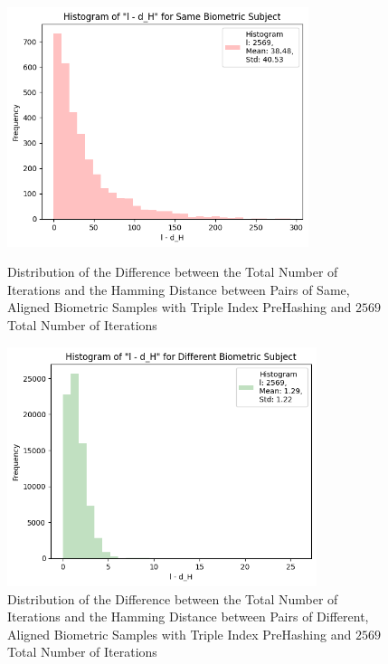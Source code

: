 \begin{enumerate}
\begin{itemize}
            \begin{figure}[H]
                \centering
                \begin{minipage}[b]{0.48\linewidth}
                    \centering
                    \includegraphics[width=\linewidth,height=7cm,keepaspectratio]{latex-img/l-dHconfig3_same.png}
                    \caption{Distribution of the Difference between the Total Number of Iterations and the Hamming Distance between Pairs of Same, Aligned Biometric Samples with Triple Index PreHashing and $2569$ Total Number of Iterations}
                    \label{l-dHconfig3_same}
                \end{minipage}
                \hfill
                \begin{minipage}[b]{0.48\linewidth}
                    \centering
                    \includegraphics[width=\linewidth,height=7cm,keepaspectratio]{latex-img/l-dHconfig3_diff.png}
                    \caption{Distribution of the Difference between the Total Number of Iterations and the Hamming Distance between Pairs of Different, Aligned Biometric Samples with Triple Index PreHashing and $2569$ Total Number of Iterations}
                    \label{l-dHconfig3_diff}
                \end{minipage}
            \end{figure}


\end{itemize}
\end{enumerate}
